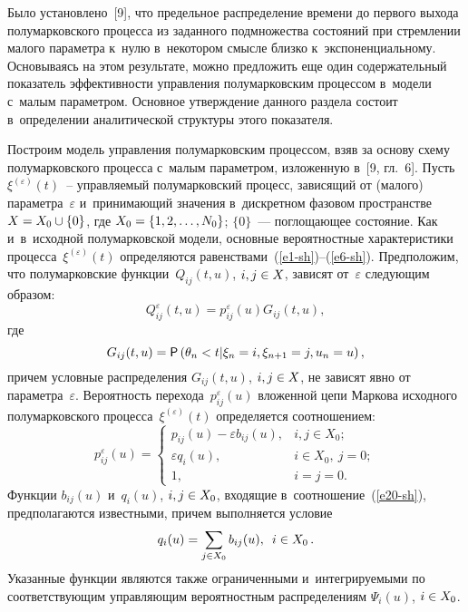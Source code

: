 \begin{multicols}{2}
Было установлено~[9], что предельное распределение времени до первого выхода 
полумарковского процесса из заданного подмножества состояний при стремлении 
малого параметра к~нулю в~некотором смысле близ\-ко к~экспоненциальному. 
Основываясь на этом результате, можно предложить еще один содержательный 
показатель эффективности управ\-ле\-ния полумарковским процессом в~модели с~малым 
параметром. Основное утверж\-де\-ние данного раздела со\-сто\-ит в~определении 
аналитической структуры этого показателя.

Построим модель управления полумарковским процессом, взяв за основу схему 
полумарковского процесса с~малым па\-ра\-мет\-ром, изложенную в~[9, гл.~6]. Пусть 
$\xi^{(\varepsilon )} (t)$~-- управ\-ля\-емый полумарковский процесс, зависящий от 
(малого) па\-ра\-ме\-тра~$\varepsilon$ и~принимающий значения в~дискретном фазовом 
пространстве  $X\hm=X_{0} \cup \{0\}$, где $X_0\hm=\{1,2,\dots,N_0\}$;  $\{0\}$~--- 
по\-гло\-ща\-ющее со\-сто\-яние. Как и~в~исходной полумарковской модели, основные 
вероятностные характеристики процесса~$\xi^{(\varepsilon)}(t)$ определяются 
равенствами~(\ref{e1-sh})--(\ref{e6-sh}). Предположим, что полумарковские 
функции~$Q_{ij}(t,u)$, $i,j\hm\in X$, зависят от~$\varepsilon$ сле\-ду\-ющим образом: 
$$
Q_{ij}^{\varepsilon } (t,u)=p_{ij}^{\varepsilon } (u)G_{ij}^{} (t,u), 
$$
где 
$$
G_{ij}(t,u)=\mathsf{P}\left(\theta_n<t| \xi_n=i, \xi_{n+1}\hm=j, u_n=u\right),
$$ 
причем условные 
распределения $G_{ij}(t,u)$, $i,j\hm\in X$, не зависят явно от па\-ра\-мет\-ра~$\varepsilon$. 
Ве\-ро\-ят\-ность перехода~$p_{ij}^{\varepsilon }(u)$ вложенной цепи 
Маркова исходного полумарковского процесса~$\xi ^{(\varepsilon)} (t)$ 
определяется соотношением:
\begin{equation}
p_{ij}^{\varepsilon } (u)=\begin{cases}
 p_{ij} (u)-\varepsilon b_{ij} (u), & i,j\in X_{0}; \\ 
\varepsilon q_{i} (u), & i\in X_{0},\ j=0; \\ 
1, &i=j=0. 
\end{cases}
\label{e20-sh}
\end{equation}
Функции $b_{ij}(u)$ и~$q_i(u)$, $i,j\hm\in X_0$, входящие в~соотношение~(\ref{e20-sh}), 
предполагаются известными, причем выполняется условие
$$
q_{i}(u)=\sum\limits_{j\in X_{0} }b_{ij} (u),
\enskip i\in X_0\,.
$$
 Указанные функции являются 
также ограниченными и~интегрируемыми по соответствующим управ\-ля\-ющим 
вероятностным распределениям $\Psi_i(u)$, $i\hm\in X_0$.

\smallskip


\end{multicols}
